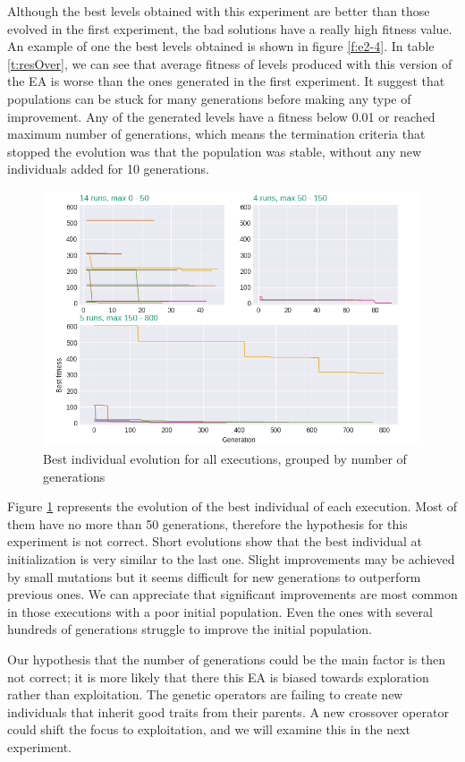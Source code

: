 \documentclass[runningheads,a4paper]{llncs}
\begin{document}
Although the best levels obtained with this experiment are better than those 
evolved in the first experiment, the bad solutions have a really high fitness 
value. An example of one the best levels obtained is shown in figure \ref{f:e2-4}.
In table \ref{t:resOver}, we can see that average fitness of levels 
produced with this version of the EA is worse than the ones generated in the 
first experiment. It suggest that populations can be stuck for many generations 
before making any type of improvement. Any of the generated levels have a 
fitness below 0.01 or reached maximum number of generations, which means the 
termination criteria that stopped the evolution was that the population was 
stable, without any new individuals added for 10 generations. 
\begin{figure}[H]
	\centering
	\includegraphics[scale=0.45]{exp2_explication.png}
	\caption{Best individual evolution for all executions, grouped by number of 
	generations}\label{f:grahp2}
\end{figure}
Figure \ref{f:grahp2} represents the evolution of the best individual of each 
execution. Most of them have no more than 50 generations, therefore the 
hypothesis for this experiment is not correct. Short evolutions show that the 
best individual at initialization is very similar to the last one. Slight 
improvements may be achieved by small mutations but it seems difficult for new 
generations to outperform previous ones. We can appreciate that significant 
improvements are most common in those executions with a poor initial 
population. Even the ones with several hundreds of generations struggle to 
improve the initial population.

Our hypothesis that the number of generations could be the main factor
is then not correct; it is more likely that there this EA is biased towards 
exploration rather than exploitation. The genetic operators are failing to 
create new individuals that inherit good traits from their parents. A new 
crossover operator could shift the focus to exploitation, and we will
examine this in the next experiment.
\end{document}
